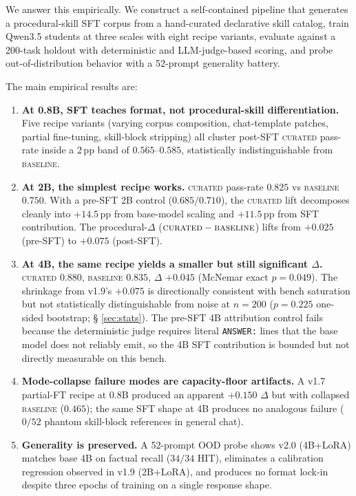 \documentclass[10pt]{article}
\newcommand{\BL}{\textsc{baseline}\xspace}
\newcommand{\CU}{\textsc{curated}\xspace}
\begin{document}
We answer this empirically. We construct a self-contained pipeline that generates a procedural-skill SFT corpus from a hand-curated declarative skill catalog, train Qwen3.5 students at three scales with eight recipe variants, evaluate against a 200-task holdout with deterministic and LLM-judge-based scoring, and probe out-of-distribution behavior with a 52-prompt generality battery.

The main empirical results are:
\begin{enumerate}[leftmargin=*]
  \item \textbf{At 0.8B, SFT teaches format, not procedural-skill differentiation.} Five recipe variants (varying corpus composition, chat-template patches, partial fine-tuning, skill-block stripping) all cluster post-SFT \CU{} pass-rate inside a 2\,pp band of $0.565$--$0.585$, statistically indistinguishable from \BL.
  \item \textbf{At 2B, the simplest recipe works.} \CU{} pass-rate $0.825$ vs \BL{} $0.750$. With a pre-SFT 2B control ($0.685/0.710$), the \CU{} lift decomposes cleanly into $+14.5$\,pp from base-model scaling and $+11.5$\,pp from SFT contribution. The procedural-$\Delta$ ($\CU - \BL$) lifts from $+0.025$ (pre-SFT) to $+0.075$ (post-SFT).
  \item \textbf{At 4B, the same recipe yields a smaller but still significant $\Delta$.} \CU{} $0.880$, \BL{} $0.835$, $\Delta$ $+0.045$ (McNemar exact $p{=}0.049$). The shrinkage from v1.9's $+0.075$ is directionally consistent with bench saturation but not statistically distinguishable from noise at $n{=}200$ ($p{=}0.225$ one-sided bootstrap; § \ref{sec:stats}). The pre-SFT 4B attribution control fails because the deterministic judge requires literal \texttt{ANSWER:} lines that the base model does not reliably emit, so the 4B SFT contribution is bounded but not directly measurable on this bench.
  \item \textbf{Mode-collapse failure modes are capacity-floor artifacts.} A v1.7 partial-FT recipe at 0.8B produced an apparent $+0.150$ $\Delta$ but with collapsed \BL{} ($0.465$); the same SFT shape at 4B produces no analogous failure ($0/52$ phantom skill-block references in general chat).
  \item \textbf{Generality is preserved.} A 52-prompt OOD probe shows v2.0 (4B+LoRA) matches base 4B on factual recall ($34/34$ HIT), eliminates a calibration regression observed in v1.9 (2B+LoRA), and produces no format lock-in despite three epochs of training on a single response shape.
\end{enumerate}
\end{document}
